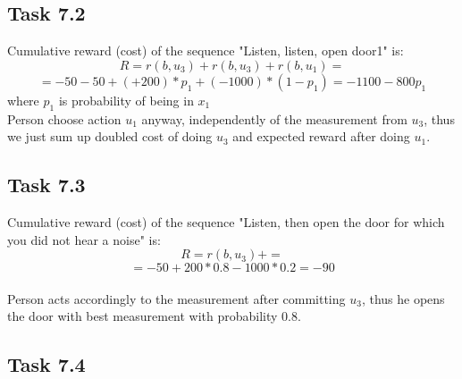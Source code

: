 \documentclass[english]{scrartcl}
\begin{document}
\subsection*{Task 7.2}
Cumulative reward (cost) of the sequence "Listen, listen, open door1" is: 
$$R=r(b,u_3)+r(b,u_3)+r(b,u_1)=$$
$$=-50-50+(+200)*p_{1}+(-1000)*(1-p_{1})=-1100-800p_1$$ where $p_1$ is probability of being in $x_1$
\\Person choose action $u_{1}$ anyway, independently of the measurement from $u_{3}$, thus we just sum up doubled cost of doing $u_{3}$ and expected reward after doing $u_{1}$.

\subsection*{Task 7.3}
Cumulative reward (cost) of the sequence "Listen, then open the door for which you did not hear a noise" is:
$$R=r(b,u_3)+=$$
$$=-50+200*0.8-1000*0.2=-90$$
\\Person acts accordingly to the measurement after committing $u_{3}$, thus he opens the door with best measurement with probability 0.8.

\subsection*{Task 7.4}
\end{document}
